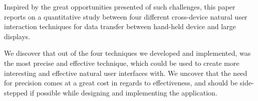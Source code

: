 Inspired by the great opportunities presented of such challenges, this paper reports on a quantitative study between four different cross-device natural user interaction techniques for data transfer between hand-held device and large displays.

We discover that out of the four techniques we developed and implemented, \swipe was the most precise and effective technique, which could be used to create more interesting and effective natural user interfaces with. We uncover that the need for precision comes at a great cost in regards to effectiveness, and should be side-stepped if possible while designing and implementing the application.  

